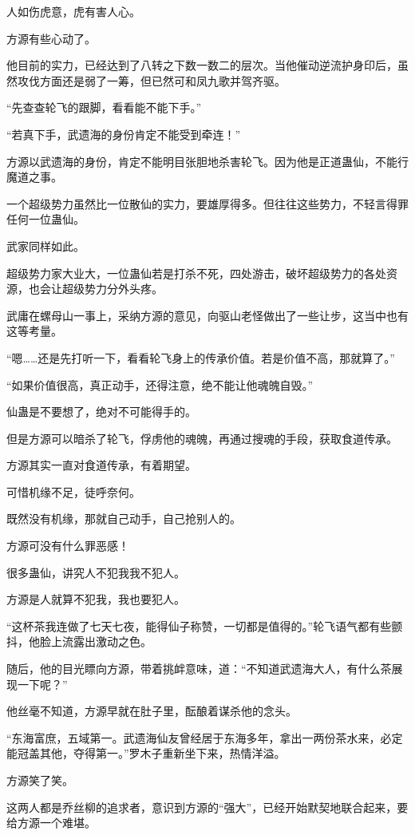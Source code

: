 \begin{this_body}
人如伤虎意，虎有害人心。

方源有些心动了。

他目前的实力，已经达到了八转之下数一数二的层次。当他催动逆流护身印后，虽然攻伐方面还是弱了一筹，但已然可和凤九歌并驾齐驱。

“先查查轮飞的跟脚，看看能不能下手。”

“若真下手，武遗海的身份肯定不能受到牵连！”

方源以武遗海的身份，肯定不能明目张胆地杀害轮飞。因为他是正道蛊仙，不能行魔道之事。

一个超级势力虽然比一位散仙的实力，要雄厚得多。但往往这些势力，不轻言得罪任何一位蛊仙。

武家同样如此。

超级势力家大业大，一位蛊仙若是打杀不死，四处游击，破坏超级势力的各处资源，也会让超级势力分外头疼。

武庸在螺母山一事上，采纳方源的意见，向驱山老怪做出了一些让步，这当中也有这等考量。

“嗯……还是先打听一下，看看轮飞身上的传承价值。若是价值不高，那就算了。”

“如果价值很高，真正动手，还得注意，绝不能让他魂魄自毁。”

仙蛊是不要想了，绝对不可能得手的。

但是方源可以暗杀了轮飞，俘虏他的魂魄，再通过搜魂的手段，获取食道传承。

方源其实一直对食道传承，有着期望。

可惜机缘不足，徒呼奈何。

既然没有机缘，那就自己动手，自己抢别人的。

方源可没有什么罪恶感！

很多蛊仙，讲究人不犯我我不犯人。

方源是人就算不犯我，我也要犯人。

“这杯茶我连做了七天七夜，能得仙子称赞，一切都是值得的。”轮飞语气都有些颤抖，他脸上流露出激动之色。

随后，他的目光瞟向方源，带着挑衅意味，道：“不知道武遗海大人，有什么茶展现一下呢？”

他丝毫不知道，方源早就在肚子里，酝酿着谋杀他的念头。

“东海富庶，五域第一。武遗海仙友曾经居于东海多年，拿出一两份茶水来，必定能冠盖其他，夺得第一。”罗木子重新坐下来，热情洋溢。

方源笑了笑。

这两人都是乔丝柳的追求者，意识到方源的“强大”，已经开始默契地联合起来，要给方源一个难堪。


\end{this_body}
